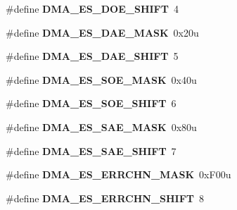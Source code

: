 \begin{DoxyCompactItemize}
\item 
\#define {\bfseries D\+M\+A\+\_\+\+E\+S\+\_\+\+D\+O\+E\+\_\+\+S\+H\+I\+FT}~4\hypertarget{group__DMA__Register__Masks_gaa9853f8e3fc7f440fcfc0b1f098ffecc}{}\label{group__DMA__Register__Masks_gaa9853f8e3fc7f440fcfc0b1f098ffecc}

\item 
\#define {\bfseries D\+M\+A\+\_\+\+E\+S\+\_\+\+D\+A\+E\+\_\+\+M\+A\+SK}~0x20u\hypertarget{group__DMA__Register__Masks_ga62debcb73cec6b330300520172723ff6}{}\label{group__DMA__Register__Masks_ga62debcb73cec6b330300520172723ff6}

\item 
\#define {\bfseries D\+M\+A\+\_\+\+E\+S\+\_\+\+D\+A\+E\+\_\+\+S\+H\+I\+FT}~5\hypertarget{group__DMA__Register__Masks_ga13c3980b6560b52840cd338f4970966f}{}\label{group__DMA__Register__Masks_ga13c3980b6560b52840cd338f4970966f}

\item 
\#define {\bfseries D\+M\+A\+\_\+\+E\+S\+\_\+\+S\+O\+E\+\_\+\+M\+A\+SK}~0x40u\hypertarget{group__DMA__Register__Masks_gad2b80aca760f9cbb20c913eac38db2c7}{}\label{group__DMA__Register__Masks_gad2b80aca760f9cbb20c913eac38db2c7}

\item 
\#define {\bfseries D\+M\+A\+\_\+\+E\+S\+\_\+\+S\+O\+E\+\_\+\+S\+H\+I\+FT}~6\hypertarget{group__DMA__Register__Masks_ga3298918e14680c42e624d78d13dac2ba}{}\label{group__DMA__Register__Masks_ga3298918e14680c42e624d78d13dac2ba}

\item 
\#define {\bfseries D\+M\+A\+\_\+\+E\+S\+\_\+\+S\+A\+E\+\_\+\+M\+A\+SK}~0x80u\hypertarget{group__DMA__Register__Masks_gac5a0c75aa964d00ff152c804b9100701}{}\label{group__DMA__Register__Masks_gac5a0c75aa964d00ff152c804b9100701}

\item 
\#define {\bfseries D\+M\+A\+\_\+\+E\+S\+\_\+\+S\+A\+E\+\_\+\+S\+H\+I\+FT}~7\hypertarget{group__DMA__Register__Masks_gab8fcc55b025406188612ca7ea6fd4eb7}{}\label{group__DMA__Register__Masks_gab8fcc55b025406188612ca7ea6fd4eb7}

\item 
\#define {\bfseries D\+M\+A\+\_\+\+E\+S\+\_\+\+E\+R\+R\+C\+H\+N\+\_\+\+M\+A\+SK}~0x\+F00u\hypertarget{group__DMA__Register__Masks_ga1706839a3ec91f2cd194526d1d5fc60e}{}\label{group__DMA__Register__Masks_ga1706839a3ec91f2cd194526d1d5fc60e}

\item 
\#define {\bfseries D\+M\+A\+\_\+\+E\+S\+\_\+\+E\+R\+R\+C\+H\+N\+\_\+\+S\+H\+I\+FT}~8\hypertarget{group__DMA__Register__Masks_ga67f75f97e4bc971fa4044115d2831ede}{}\label{group__DMA__Register__Masks_ga67f75f97e4bc971fa4044115d2831ede}


\end{DoxyCompactItemize}
